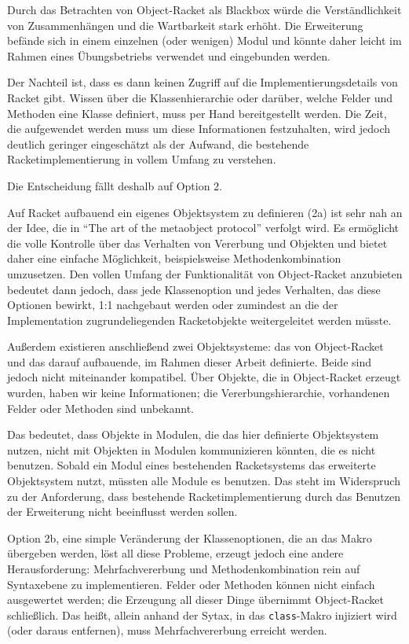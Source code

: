Durch das Betrachten von Object-Racket als Blackbox würde die Verständlichkeit von Zusammenhängen und die Wartbarkeit stark erhöht. Die Erweiterung befände sich in einem einzelnen (oder wenigen) Modul und könnte daher leicht im Rahmen eines Übungsbetriebs verwendet und eingebunden werden.

Der Nachteil ist, dass es dann keinen Zugriff auf die Implementierungsdetails von Racket gibt. Wissen über die Klassenhierarchie oder darüber, welche Felder und Methoden eine Klasse definiert, muss per Hand bereitgestellt werden. Die Zeit, die aufgewendet werden muss um diese Informationen festzuhalten, wird jedoch deutlich geringer eingeschätzt als der Aufwand, die bestehende Racketimplementierung in vollem Umfang zu verstehen. 

Die Entscheidung fällt deshalb auf Option 2.

Auf Racket aufbauend ein eigenes Objektsystem zu definieren (2a) ist sehr nah an der Idee, die in ``The art of the metaobject protocol'' \cite{amop} verfolgt wird. Es ermöglicht die volle Kontrolle über das Verhalten von Vererbung und Objekten und bietet daher eine einfache Möglichkeit, beispielsweise Methodenkombination umzusetzen. Den vollen Umfang der Funktionalität von Object-Racket anzubieten bedeutet dann jedoch, dass jede Klassenoption und jedes Verhalten, das diese Optionen bewirkt, 1:1 nachgebaut werden oder zumindest an die der Implementation zugrundeliegenden Racketobjekte weitergeleitet werden müsste.

Außerdem existieren anschließend zwei Objektsysteme: das von Object-Racket und das darauf aufbauende, im Rahmen dieser Arbeit definierte. Beide sind jedoch nicht miteinander kompatibel. Über Objekte, die in Object-Racket erzeugt wurden, haben wir keine Informationen; die Vererbungshierarchie, vorhandenen Felder oder Methoden sind unbekannt. 

Das bedeutet, dass Objekte in Modulen, die das hier definierte Objektsystem nutzen, nicht mit Objekten in Modulen kommunizieren könnten, die es nicht benutzen. Sobald ein Modul eines bestehenden Racketsystems das erweiterte Objektsystem nutzt, müssten alle Module es benutzen. Das steht im Widerspruch zu der Anforderung, dass bestehende Racketimplementierung durch das Benutzen der Erweiterung nicht beeinflusst werden sollen.

Option 2b, eine simple Veränderung der Klassenoptionen, die an das Makro übergeben werden, löst all diese Probleme, erzeugt jedoch eine andere Herausforderung: Mehrfachvererbung und Methodenkombination rein auf Syntaxebene zu implementieren. Felder oder Methoden können nicht einfach ausgewertet werden; die Erzeugung all dieser Dinge übernimmt Object-Racket schließlich. Das heißt, allein anhand der Sytax, in das \texttt{class}-Makro injiziert wird (oder daraus entfernen), muss Mehrfachvererbung erreicht werden.


